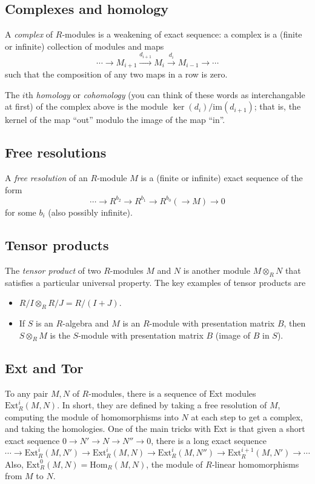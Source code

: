 \documentclass[12pt]{amsart}
\begin{document}
\subsection*{Complexes and homology} A \emph{complex} of $R$-modules is a weakening of exact sequence: a complex is a (finite or infinite) collection of modules and maps
\[ \cdots  \rightarrow M_{i+1} \xrightarrow{d_{i+1}} M_{i} \xrightarrow{d_{i}} M_{i-1} \rightarrow \cdots\]
such that the composition of any two maps in a row is zero.

The $i$th \emph{homology} or \emph{cohomology} (you can think of these words as interchangable at first) of the complex above is the module $\ker(d_i)/\mathrm{im}(d_{i+1})$; that is, the kernel of the map ``out'' modulo the image of the map ``in''.

\subsection*{Free resolutions} A \emph{free resolution} of an $R$-module $M$ is a (finite or infinite) exact sequence of the form
\[ \cdots\to  R^{b_2} \rightarrow R^{b_1} \rightarrow R^{b_0}(  \rightarrow M) \to 0\]
for some $b_i$ (also possibly infinite). 

\subsection*{Tensor products} The \emph{tensor product} of two $R$-modules $M$ and $N$ is another module $M\otimes_R N$ that satisfies a particular universal property. The key examples of tensor products are
\begin{itemize} 
\item $R/I \otimes_R R/J = R/(I+J)$.
\item If $S$ is an $R$-algebra and $M$ is an $R$-module with presentation matrix $B$, then $S\otimes_R M$ is the $S$-module with presentation matrix $B$ (image of $B$ in $S$).
\end{itemize}


\subsection*{Ext and Tor} To any pair $M,N$ of $R$-modules, there is a sequence of $\mathrm{Ext}$ modules $\mathrm{Ext}^i_R(M,N)$. In short, they are defined by taking a free resolution of $M$, computing the module of homomorphisms into $N$ at each step to get a complex, and taking the homologies. One of the main tricks with $\mathrm{Ext}$ is that given a short exact sequence $0\to N' \to N \to N'' \to 0$, there is a long exact sequence
\[ \cdots \to \mathrm{Ext}^i_R(M,N') \to \mathrm{Ext}^i_R(M,N) \to \mathrm{Ext}^i_R(M,N'') \to \mathrm{Ext}^{i+1}_R(M,N') \to \cdots\]
Also, $\mathrm{Ext}^0_R(M,N)=\mathrm{Hom}_R(M,N)$, the module of $R$-linear homomorphisms from $M$ to $N$.
\end{document}
